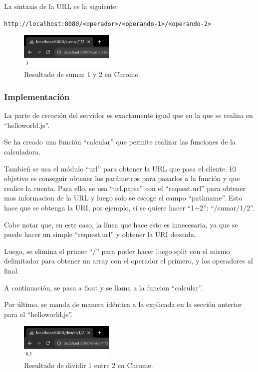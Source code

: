 \documentclass{article}
\begin{document}
La sintaxis de la URL es la siguiente: 

\verb|http://localhost:8080/<operador>/<operando-1>/<operando-2>|


\begin{figure}[H]
    \centering
    \includegraphics[width=0.4\textwidth]{images/rescalcnormal.png}
    \caption{Resultado de sumar 1 y 2 en Chrome.}
\end{figure}

\subsubsection{Implementación}
La parte de creación del servidor es exactamente igual que en la que se realiza en ``helloworld.js''.

Se ha creado una función ``calcular'' que permite realizar las funciones de la calculadora.

Tambień se usa el módulo ``url'' para obtener la URL que pasa el cliente. El objetivo es conseguir obtener los parámetros para pasarlos a la función y que realice la cuenta. Para ello, se usa ``url.parse'' con el ``request.url'' para obtener mas informacion de la URL y luego solo se escoge el campo ``pathname''. Esto hace que se obtenga la URI, por ejemplo, si se quiere hacer ``1+2'': ``/sumar/1/2''.

Cabe notar que, en este caso, la línea que hace esto es innecesaria, ya que se puede hacer un simple ``request.url'' y obtener la URI deseada.


Luego, se elimina el primer ``/'' para poder hacer luego split con el mismo delimitador para obtener un array con el operador el primero, y los operadores al final.

A continuación, se pasa a float y se llama a la funcion ``calcular''.

Por último, se manda de manera idéntica a la explicada en la sección anterior para el ``helloworld.js''.

\begin{figure}[H]
    \centering
    \includegraphics[width=0.4\textwidth]{images/dividircnormal.png}
    \caption{Resultado de dividir 1 entre 2 en Chrome.}
\end{figure}
\end{document}
